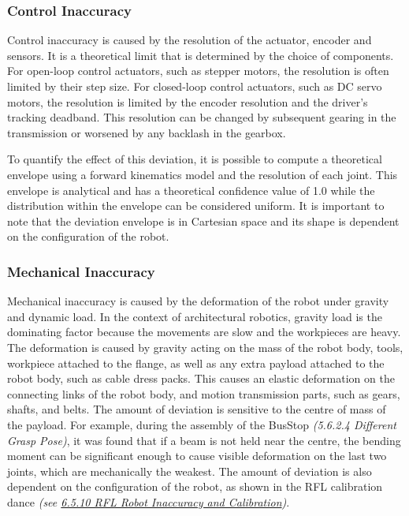 \subsubsection{Control Inaccuracy}

Control inaccuracy is caused by the resolution of the actuator, encoder and sensors. It is a theoretical limit that is determined by the choice of components. For open-loop control actuators, such as stepper motors, the resolution is often limited by their step size. For closed-loop control actuators, such as DC servo motors, the resolution is limited by the encoder resolution and the driver's tracking deadband. This resolution can be changed by subsequent gearing in the transmission or worsened by any backlash in the gearbox. 

To quantify the effect of this deviation, it is possible to compute a theoretical envelope using a forward kinematics model and the resolution of each joint. This envelope is analytical and has a theoretical confidence value of 1.0 while the distribution within the envelope can be considered uniform. It is important to note that the deviation envelope is in Cartesian space and its shape is dependent on the configuration of the robot.

\subsubsection{Mechanical Inaccuracy}

Mechanical inaccuracy is caused by the deformation of the robot under gravity and dynamic load. In the context of architectural robotics, gravity load is the dominating factor because the movements are slow and the workpieces are heavy. The deformation is caused by gravity acting on the mass of the robot body, tools, workpiece attached to the flange, as well as any extra payload attached to the robot body, such as cable dress packs. This causes an elastic deformation on the connecting links of the robot body, and motion transmission parts, such as gears, shafts, and belts. The amount of deviation is sensitive to the centre of mass of the payload. For example, during the assembly of the BusStop\textit{ (5.6.2.4 Different Grasp Pose)}, it was found that if a beam is not held near the centre, the bending moment can be significant enough to cause visible deformation on the last two joints, which are mechanically the weakest. The amount of deviation is also dependent on the configuration of the robot, as shown in the RFL calibration dance\textit{ (see \ul{6.5.10 RFL Robot Inaccuracy and Calibration})}.

